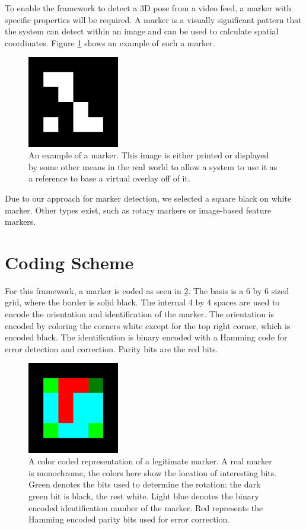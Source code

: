 \label{section_markers}

To enable the framework to detect a 3D pose from a video feed, a marker with specific properties will be required.
A marker is a visually significant pattern that the system can detect within an image and can be used to calculate spatial coordinates.
Figure \ref{fig:marker_example} shows an example of such a marker.

\begin{figure}
	\centering
	\includegraphics[width=4cm]{img/marker_example.png}
	\caption[Example Marker.]{An example of a marker. This image is either printed or displayed by some other means in the real world to allow a system to use it as a reference to base a virtual overlay off of it.}
	\label{fig:marker_example}
\end{figure}

Due to our approach for marker detection, we selected a square black on white marker.
Other types exist, such as rotary markers or image-based feature markers.

\section{Coding Scheme}

For this framework, a marker is coded as seen in \ref{fig:marker_template}.
The basis is a 6 by 6 sized grid, where the border is solid black.
The internal 4 by 4 spaces are used to encode the orientation and identification of the marker.
The orientation is encoded by coloring the corners white except for the top right corner, which is encoded black.
The identification is binary encoded with a Hamming code\cite{hamming} for error detection and correction.
Parity bits are the red bits.

\begin{figure}
	\centering
	\includegraphics[width=4cm]{img/marker_template.png}
	\caption[Template Marker.]{A color coded representation of a legitimate marker. A real marker is monochrome, the colors here show the location of interesting bits. Green denotes the bits used to determine the rotation: the dark green bit is black, the rest white. Light blue denotes the binary encoded identification number of the marker. Red represents the Hamming encoded parity bits used for error correction.}
	\label{fig:marker_template}
\end{figure}

